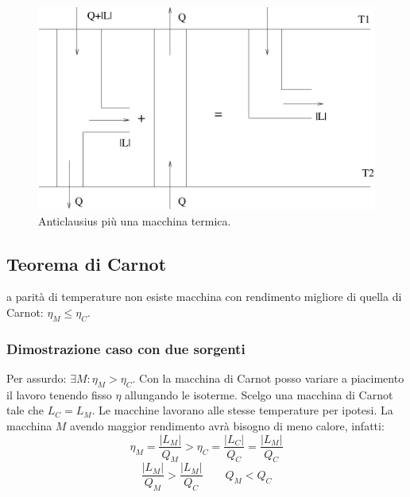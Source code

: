\begin{figure}[htbp]
\centering
\includegraphics[scale=0.5]{immagini/fisica1/AC+Carnot}
\caption{Anticlausius più una macchina termica.}
\label{CK2}
\end{figure}

\subsection{Teorema di Carnot}
\begin{Teo}
a parità di temperature non esiste macchina con rendimento migliore di quella di Carnot: $\eta_M\leq\eta_C$.
\end{Teo}
\subsubsection{Dimostrazione caso con due sorgenti}
Per assurdo: $\exists M: \eta_M>\eta_C$. Con la macchina di Carnot posso variare a piacimento il lavoro tenendo fisso $\eta$ allungando le isoterme. Scelgo una macchina di Carnot tale che $L_C=L_M$. Le macchine lavorano alle stesse temperature per ipotesi. La macchina $M$ avendo maggior rendimento avrà bisogno di meno calore, infatti:
\[\eta_M=\frac{|L_M|}{Q_M}>\eta_C=\frac{|L_C|}{Q_C}=\frac{|L_M|}{Q_C}\]
\[\frac{|L_M|}{Q_M}>\frac{|L_M|}{Q_C} \qquad Q_M<Q_C\]

